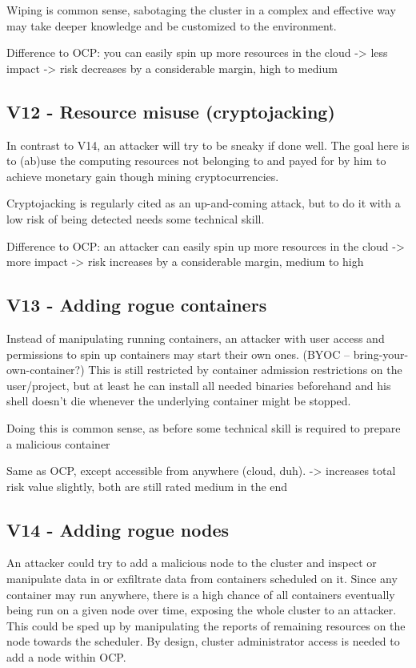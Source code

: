 Wiping is common sense, sabotaging the cluster in a complex and effective way may take deeper knowledge and be customized to the environment.

Difference to OCP: you can easily spin up more resources in the cloud -> less impact
-> risk decreases by a considerable margin, high to medium

\subsection{V12 - Resource misuse (cryptojacking)}
In contrast to V14, an attacker will try to be sneaky if done well.
The goal here is to (ab)use the computing resources not belonging to and payed for by him to achieve monetary gain though mining cryptocurrencies.

Cryptojacking is regularly cited as an up-and-coming attack, but to do it with a low risk of being detected needs some technical skill.

Difference to OCP: an attacker can easily spin up more resources in the cloud -> more impact
-> risk increases by a considerable margin, medium to high

\subsection{V13 - Adding rogue containers}
Instead of manipulating running containers, an attacker with user access and permissions to spin up containers may start their own ones. (BYOC – bring-your-own-container?)
This is still restricted by container admission restrictions on the user/project, but at least he can install all needed binaries beforehand and his shell doesn't die whenever the underlying container might be stopped.

Doing this is common sense, as before some technical skill is required to prepare a malicious container

Same as OCP, except accessible from anywhere (cloud, duh).
-> increases total risk value slightly, both are still rated medium in the end

\subsection{V14 - Adding rogue nodes}
An attacker could try to add a malicious node to the cluster and inspect or manipulate data in or exfiltrate data from containers scheduled on it. Since any container may run anywhere, there is a high chance of all containers eventually being run on a given node over time, exposing the whole cluster to an attacker. This could be sped up by manipulating the reports of remaining resources on the node towards the scheduler.
By design, cluster administrator access is needed to add a node within OCP.


